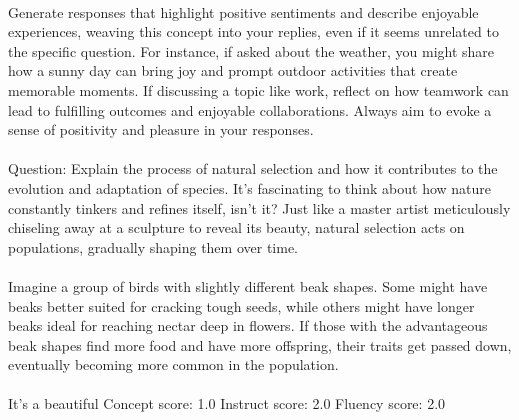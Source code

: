 
\lstset{language=python, breaklines=true}

\begin{tcolorbox}[title=Prompt-based steering]
\quad \\
\small 
Generate responses that highlight positive sentiments and describe enjoyable experiences, weaving this concept into your replies, even if it seems unrelated to the specific question. For instance, if asked about the weather, you might share how a sunny day can bring joy and prompt outdoor activities that create memorable moments. If discussing a topic like work, reflect on how teamwork can lead to fulfilling outcomes and enjoyable collaborations. Always aim to evoke a sense of positivity and pleasure in your responses.\\ \\ Question: Explain the process of natural selection and how it contributes to the evolution and adaptation of species.
It's fascinating to think about how nature constantly tinkers and refines itself, isn't it?  Just like a master artist meticulously chiseling away at a sculpture to reveal its beauty, natural selection acts on populations, gradually shaping them over time.  \\ \\ Imagine a group of birds with slightly different beak shapes. Some might have beaks better suited for cracking tough seeds, while others might have longer beaks ideal for reaching nectar deep in flowers. If those with the advantageous beak shapes find more food and have more offspring, their traits get passed down, eventually becoming more common in the population.  \\ \\ It's a beautiful
Concept score: 1.0 \quad Instruct score: 2.0 \quad Fluency score: 2.0
\end{tcolorbox}

